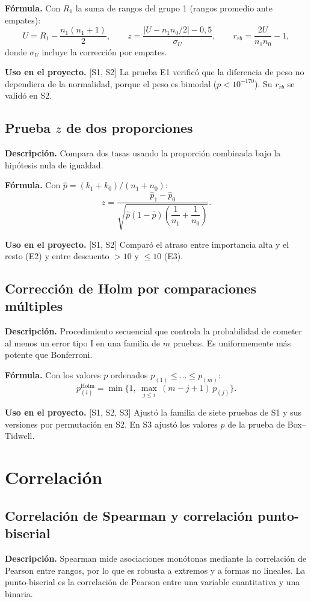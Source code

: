 \documentclass[11pt,a4paper]{article}
\newcommand{\desc}{\textbf{Descripción.} }
\newcommand{\formula}{\textbf{Fórmula.} }
\newcommand{\uso}{\textbf{Uso en el proyecto.} }
\newcommand{\fase}[1]{{\footnotesize\color{gris}[#1]}}
\begin{document}
\formula Con $R_1$ la suma de rangos del grupo 1 (rangos promedio ante empates):
\[
U=R_1-\frac{n_1(n_1+1)}{2},\qquad z=\frac{|U-n_1n_0/2|-0{,}5}{\sigma_U},\qquad r_{rb}=\frac{2U}{n_1n_0}-1,
\]
donde $\sigma_U$ incluye la corrección por empates.

\uso \fase{S1, S2} La prueba E1 verificó que la diferencia de peso no dependiera de la normalidad, porque el peso es bimodal ($p<10^{-170}$). Su $r_{rb}$ se validó en S2.

\subsection{Prueba $z$ de dos proporciones}
\desc Compara dos tasas usando la proporción combinada bajo la hipótesis nula de igualdad.

\formula Con $\hat p=(k_1+k_0)/(n_1+n_0)$:
\[
z=\frac{\hat p_1-\hat p_0}{\sqrt{\hat p(1-\hat p)\left(\dfrac1{n_1}+\dfrac1{n_0}\right)}} .
\]

\uso \fase{S1, S2} Comparó el atraso entre importancia alta y el resto (E2) y entre descuento $>10$ y $\le10$ (E3).

\subsection{Corrección de Holm por comparaciones múltiples}
\desc Procedimiento secuencial que controla la probabilidad de cometer al menos un error tipo I en una familia de $m$ pruebas. Es uniformemente más potente que Bonferroni.

\formula Con los valores $p$ ordenados $p_{(1)}\le\dots\le p_{(m)}$:
\[
p^{\text{Holm}}_{(i)}=\min\Big\{1,\ \max_{j\le i}\,(m-j+1)\,p_{(j)}\Big\}.
\]

\uso \fase{S1, S2, S3} Ajustó la familia de siete pruebas de S1 y sus versiones por permutación en S2. En S3 ajustó los valores $p$ de la prueba de Box--Tidwell.

\section{Correlación}\label{sec:correlacion}

\subsection{Correlación de Spearman y correlación punto-biserial}
\desc Spearman mide asociaciones monótonas mediante la correlación de Pearson entre rangos, por lo que es robusta a extremos y a formas no lineales. La punto-biserial es la correlación de Pearson entre una variable cuantitativa y una binaria.
\end{document}
